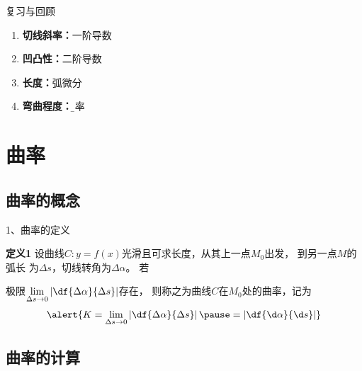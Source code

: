 \begin{frame}{复习与回顾}
	\linespread{1.5}
	
	\begin{enumerate}
	  \item {\bf 切线斜率：}一阶导数
	  \item {\bf 凹凸性：}二阶导数
	  \item {\bf 长度：}弧微分\pause
	  \item {\bf 弯曲程度：}{\b 曲率}
	\end{enumerate}
\end{frame}

\section{曲率}

\subsection{曲率的概念}



\begin{frame}{1、曲率的定义}
	\linespread{1.5}
	\pause
	\begin{block}{{\bf 定义1}\hfill }
		设曲线$C:y=f(x)$光滑且可求长度，从其上一点$M_0$出发，
		到另一点$M$的弧长
		为$\Delta s$，切线转角为$\Delta\alpha$。
		\pause 若
		
		极限$\lim\limits_{\Delta s\to
		0}\left|\df{\Delta\alpha}{\Delta s}\right|$存在，
		则称之为{\bb 曲线$C$在$M_0$处的曲率}，记为
	$$\alert{K=\lim\limits_{\Delta s\to
				0}\left|\df{\Delta\alpha}{\Delta s}\right|\pause
				=\left|\df{\d\alpha}{\d s}\right|}$$ 
	\end{block}
\end{frame}

\subsection{曲率的计算}

